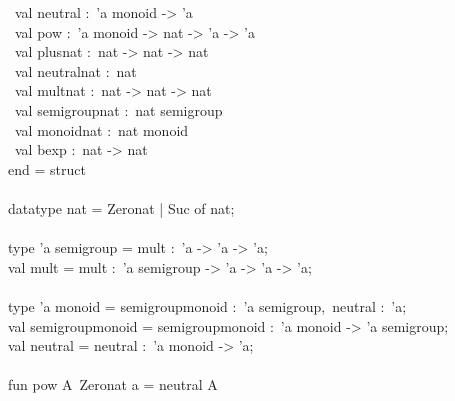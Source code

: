 \begin{isabellebody}
\begin{isamarkuptext}
\hspace*{0pt} ~val neutral :~'a monoid -> 'a\\
\hspace*{0pt} ~val pow :~'a monoid -> nat -> 'a -> 'a\\
\hspace*{0pt} ~val plus{}nat :~nat -> nat -> nat\\
\hspace*{0pt} ~val neutral{}nat :~nat\\
\hspace*{0pt} ~val mult{}nat :~nat -> nat -> nat\\
\hspace*{0pt} ~val semigroup{}nat :~nat semigroup\\
\hspace*{0pt} ~val monoid{}nat :~nat monoid\\
\hspace*{0pt} ~val bexp :~nat -> nat\\
\hspace*{0pt}end = struct\\
\hspace*{0pt}\\
\hspace*{0pt}datatype nat = Zero{}nat | Suc of nat;\\
\hspace*{0pt}\\
\hspace*{0pt}type 'a semigroup = {}mult :~'a -> 'a -> 'a{};\\
\hspace*{0pt}val mult = {}mult :~'a semigroup -> 'a -> 'a -> 'a;\\
\hspace*{0pt}\\
\hspace*{0pt}type 'a monoid = {}semigroup{}monoid :~'a semigroup,~neutral :~'a{};\\
\hspace*{0pt}val semigroup{}monoid = {}semigroup{}monoid :~'a monoid -> 'a semigroup;\\
\hspace*{0pt}val neutral = {}neutral :~'a monoid -> 'a;\\
\hspace*{0pt}\\
\hspace*{0pt}fun pow A{}~Zero{}nat a = neutral A{}\\

\end{isamarkuptext}
\end{isabellebody}

